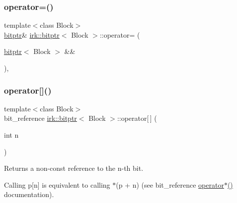 \subsubsection{\texorpdfstring{operator=()}{operator=()}\hspace{0.1cm}{\footnotesize\ttfamily [2/2]}}
{\footnotesize\ttfamily template$<$class Block$>$ \\
\mbox{\hyperlink{classirk_1_1bitptr}{bitptr}}\& \mbox{\hyperlink{classirk_1_1bitptr}{irk\+::bitptr}}$<$ Block $>$\+::operator= (\begin{DoxyParamCaption}\item[{\mbox{\hyperlink{classirk_1_1bitptr}{bitptr}}$<$ Block $>$ \&\&}]{ }\end{DoxyParamCaption})\hspace{0.3cm}{\ttfamily [default]}, {\ttfamily [noexcept]}}

\mbox{\label{classirk_1_1bitptr_a1df6b87e20b41de54fd6d582263a905d}} 
\subsubsection{\texorpdfstring{operator[]()}{operator[]()}\hspace{0.1cm}{\footnotesize\ttfamily [1/2]}}
{\footnotesize\ttfamily template$<$class Block$>$ \\
bit\+\_\+reference \mbox{\hyperlink{classirk_1_1bitptr}{irk\+::bitptr}}$<$ Block $>$\+::operator\mbox{[}$\,$\mbox{]} (\begin{DoxyParamCaption}\item[{int}]{n }\end{DoxyParamCaption})\hspace{0.3cm}{\ttfamily [inline]}}



Returns a non-\/const reference to the {\ttfamily n}-\/th bit. 

Calling p\mbox{[}n\mbox{]} is equivalent to calling $\ast$(p + n) (see {\ttfamily bit\+\_\+reference \mbox{\hyperlink{classirk_1_1bitptr_a6676fe4fc076f0cb53587ea48d8634c3}{operator$\ast$()}}} documentation). \mbox{\label{classirk_1_1bitptr_ae7ed619d650d1982a2510ca8cdd997c1}} 
